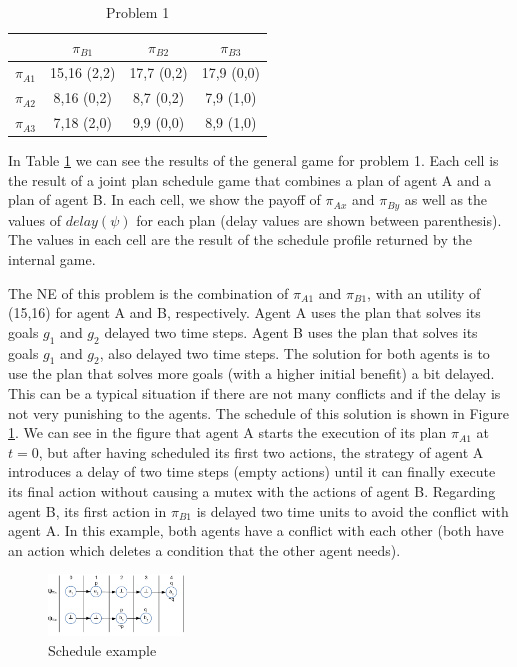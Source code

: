 \documentclass[letterpaper]{article}
\begin{document}
\begin{table}[ht]
\centering \footnotesize
\begin{tabular}{|l|c|c|c|}
 \hline

	&  $\pi_{B1}$ & $\pi_{B2}$ &  $\pi_{B3}$ \\ \hline
$\pi_{A1}$ &  15,16 (2,2) &  17,7 (0,2)  & 17,9 (0,0) \\ \hline
$\pi_{A2}$  & 8,16 (0,2) & 8,7 (0,2) & 7,9 (1,0)\\ \hline
$\pi_{A3}$ &  7,18 (2,0)&  9,9 (0,0) & 8,9 (1,0) \\ \hline


\end{tabular}
\caption{Problem 1}
\label{tab:prob1}
\end{table}


In Table \ref{tab:prob1} we can see the results of the general game for problem 1. Each cell is the result of a joint plan schedule game that combines a plan of agent A and a plan of agent B. In each cell, we show the payoff of $\pi_{Ax}$ and $\pi_{By}$ as well as the values of $delay(\psi)$ for each plan (delay values are shown between parenthesis). The values in each cell are the result of the schedule profile returned by the internal game.

The NE of this problem is the combination of $\pi_{A1}$ and $\pi_{B1}$, with an utility of (15,16) for agent A and B, respectively. Agent A uses the plan that solves its goals $g_1$ and $g_2$ delayed two time steps. Agent B uses the plan that solves its goals $g_1$ and $g_2$, also delayed two time steps. The solution for both agents is to use the plan that solves more goals (with a higher initial benefit) a bit delayed. This can be a typical situation if there are not many conflicts and if the delay is not very punishing to the agents. The schedule of this solution is shown in Figure \ref{fig:schedule}. We can see in the figure that agent A starts the execution of its plan $\pi_{A1}$ at $t=0$, but after having scheduled its first two actions, the strategy of agent A introduces a delay of two time steps (empty actions) until it can finally execute its final action without causing a mutex with the actions of agent B. Regarding agent B, its first action in $\pi_{B1}$ is delayed two time units to avoid the conflict with agent A. In this example, both agents have a conflict with each other (both have an action which deletes a condition that the other agent needs).


\begin{figure}[ht]
    \centering
    \includegraphics[width=0.32\textwidth]{schedule}
    \caption{Schedule example}
    \label{fig:schedule}
\end{figure}
\end{document}
